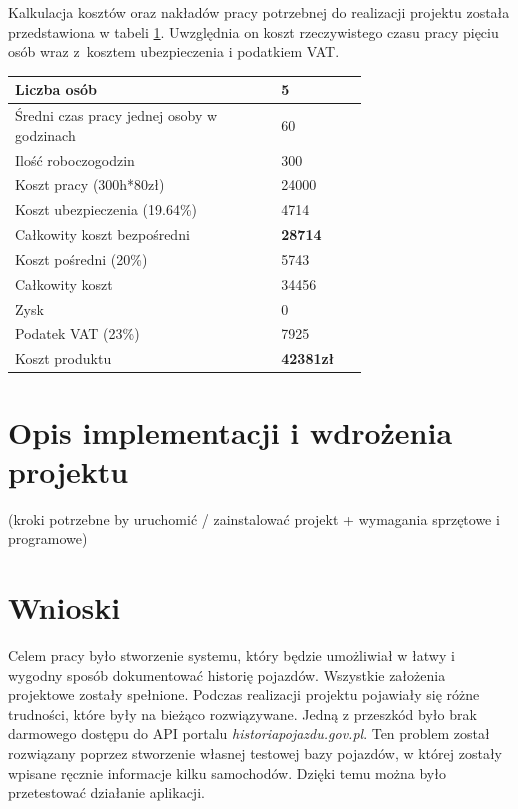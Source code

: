 \documentclass[12pt]{article}
\begin{document}
Kalkulacja kosztów oraz nakładów pracy potrzebnej do realizacji projektu została przedstawiona w tabeli \ref{kosztorys}. Uwzględnia on koszt rzeczywistego czasu pracy pięciu osób wraz z~kosztem ubezpieczenia i podatkiem VAT.

\begin{table}[H]
\begin{center}
\label{kosztorys}
	\begin{tabular}{|p{0.55\linewidth}|p{0.15\linewidth}|}%
	\hline
	Liczba osób 	& 5 				\\ \hline
	Średni czas pracy jednej osoby w godzinach		& 60\\ \hline
	Ilość roboczogodzin & 300	\\ \hline
	Koszt pracy (300h*80zł) & 24000	\\ \hline
	Koszt ubezpieczenia (19.64\%) & 4714	\\ \hline
	Całkowity koszt bezpośredni & \textbf{28714}	\\ \hline
	Koszt pośredni (20\%) & 5743\\ \hline
	Całkowity koszt & 34456\\ \hline
	Zysk & 0\\ \hline
	Podatek VAT (23\%) & 7925\\ \hline
							 \hline
	Koszt produktu & \textbf{42381zł}\\ \hline
	\end{tabular}
\end{center}
\end{table}


\newpage
\section{Opis implementacji i wdrożenia projektu}
(kroki potrzebne by uruchomić / zainstalować projekt + wymagania sprzętowe i programowe)


\newpage
\section{Wnioski}

Celem pracy było stworzenie systemu, który będzie umożliwiał w łatwy i wygodny sposób dokumentować historię pojazdów. Wszystkie założenia projektowe zostały spełnione. Podczas realizacji projektu pojawiały się różne trudności, które były na bieżąco rozwiązywane. Jedną z przeszkód było brak darmowego dostępu do API portalu \textit{historiapojazdu.gov.pl}. Ten problem został rozwiązany poprzez stworzenie własnej testowej bazy pojazdów, w której zostały wpisane ręcznie informacje kilku samochodów. Dzięki temu można było przetestować działanie aplikacji.
\end{document}
